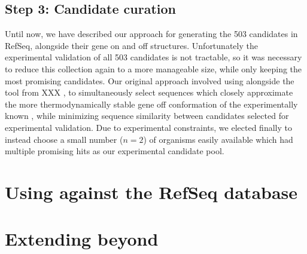 \subsection{Step 3: Candidate curation}
\label{subsec:rfinder:curation}

Until now, we have described our approach for generating the 503 \grb candidates
in RefSeq, alongside their gene on and off structures. Unfortunately the
experimental validation of all 503 candidates is not tractable, so it was
necessary to reduce this collection again to a more manageable size, while only
keeping the most promising candidates. Our original approach involved using
\foldalign alongside the  tool from XXX \cite{xxx}, to simultaneously
select sequences which closely approximate the more thermodynamically stable
gene off conformation of the experimentally known \Bsxpt \grb, while minimizing
sequence similarity between candidates selected for experimental validation. Due to
experimental constraints, we elected finally to instead choose a small number
($n = 2$) of organisms easily available which had multiple promising hits as our
experimental candidate pool.

\section{Using \rfinder against the RefSeq database}
\label{sec:rfinder:refseq}

\section{Extending beyond \grbs}
\label{sec:rfinder:ext}

